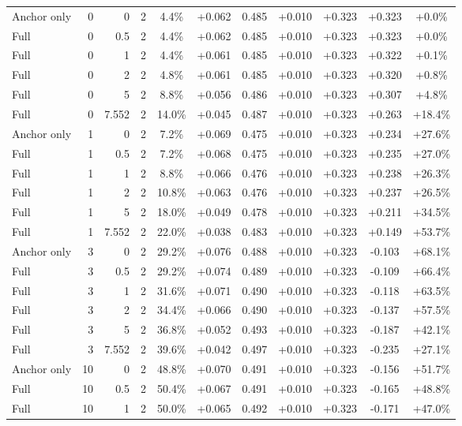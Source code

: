 \begin{table}[htbp]
\begin{tabular}{lrrrccccccc}
Anchor only & 0 & 0 & 2 & 4.4\% & +0.062 & 0.485 & +0.010 & +0.323 & +0.323 & +0.0\% \\
Full & 0 & 0.5 & 2 & 4.4\% & +0.062 & 0.485 & +0.010 & +0.323 & +0.323 & +0.0\% \\
Full & 0 & 1 & 2 & 4.4\% & +0.061 & 0.485 & +0.010 & +0.323 & +0.322 & +0.1\% \\
Full & 0 & 2 & 2 & 4.8\% & +0.061 & 0.485 & +0.010 & +0.323 & +0.320 & +0.8\% \\
Full & 0 & 5 & 2 & 8.8\% & +0.056 & 0.486 & +0.010 & +0.323 & +0.307 & +4.8\% \\
Full & 0 & 7.552 & 2 & 14.0\% & +0.045 & 0.487 & +0.010 & +0.323 & +0.263 & +18.4\% \\
Anchor only & 1 & 0 & 2 & 7.2\% & +0.069 & 0.475 & +0.010 & +0.323 & +0.234 & +27.6\% \\
Full & 1 & 0.5 & 2 & 7.2\% & +0.068 & 0.475 & +0.010 & +0.323 & +0.235 & +27.0\% \\
Full & 1 & 1 & 2 & 8.8\% & +0.066 & 0.476 & +0.010 & +0.323 & +0.238 & +26.3\% \\
Full & 1 & 2 & 2 & 10.8\% & +0.063 & 0.476 & +0.010 & +0.323 & +0.237 & +26.5\% \\
Full & 1 & 5 & 2 & 18.0\% & +0.049 & 0.478 & +0.010 & +0.323 & +0.211 & +34.5\% \\
Full & 1 & 7.552 & 2 & 22.0\% & +0.038 & 0.483 & +0.010 & +0.323 & +0.149 & +53.7\% \\
Anchor only & 3 & 0 & 2 & 29.2\% & +0.076 & 0.488 & +0.010 & +0.323 & -0.103 & +68.1\% \\
Full & 3 & 0.5 & 2 & 29.2\% & +0.074 & 0.489 & +0.010 & +0.323 & -0.109 & +66.4\% \\
Full & 3 & 1 & 2 & 31.6\% & +0.071 & 0.490 & +0.010 & +0.323 & -0.118 & +63.5\% \\
Full & 3 & 2 & 2 & 34.4\% & +0.066 & 0.490 & +0.010 & +0.323 & -0.137 & +57.5\% \\
Full & 3 & 5 & 2 & 36.8\% & +0.052 & 0.493 & +0.010 & +0.323 & -0.187 & +42.1\% \\
Full & 3 & 7.552 & 2 & 39.6\% & +0.042 & 0.497 & +0.010 & +0.323 & -0.235 & +27.1\% \\
Anchor only & 10 & 0 & 2 & 48.8\% & +0.070 & 0.491 & +0.010 & +0.323 & -0.156 & +51.7\% \\
Full & 10 & 0.5 & 2 & 50.4\% & +0.067 & 0.491 & +0.010 & +0.323 & -0.165 & +48.8\% \\
Full & 10 & 1 & 2 & 50.0\% & +0.065 & 0.492 & +0.010 & +0.323 & -0.171 & +47.0\% \\

\end{tabular}
\end{table}
